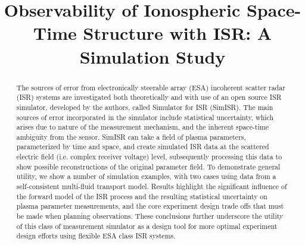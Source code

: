 \documentclass[draft,ras]{agutex}
\begin{document}
%
%


\title{Observability of Ionospheric Space-Time Structure with ISR:   A Simulation Study }

%
%


\begin{abstract}


The sources of error from electronically steerable array (ESA) incoherent scatter radar (ISR) systems are investigated both theoretically and with use of an open source ISR simulator, developed by the authors, called Simulator for ISR (SimISR). The main sources of error incorporated in the simulator include statistical uncertainty, which arises due to nature of the measurement mechanism, and the inherent space-time ambiguity from the sensor. SimISR can take a field of plasma parameters, parameterized by time and space, and create simulated ISR data at the scattered electric field (i.e. complex receiver voltage) level, subsequently processing this data to show possible reconstructions of the original parameter field. To demonstrate general utility, we show a number of simulation examples, with two cases using data from a self-consistent multi-fluid transport model. Results highlight the significant influence of the forward model of the ISR process and the resulting statistical uncertainty on plasma parameter measurements, and the core experiment design trade offs that must be made when planning observations. These conclusions further underscore the utility of this class of measurement simulator as a design tool for more optimal experiment design efforts using flexible ESA class ISR systems.


\end{abstract}
\end{document}
